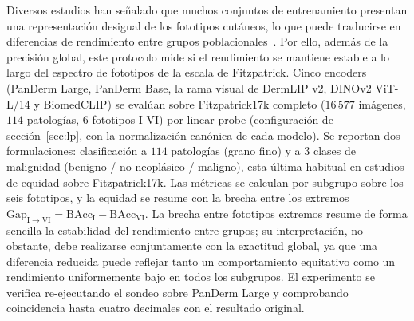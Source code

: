 Diversos estudios han señalado que muchos conjuntos de entrenamiento
presentan una representación desigual de los fototipos cutáneos, lo
que puede traducirse en diferencias de rendimiento entre grupos
poblacionales~\cite{ddi}. Por ello, además de la precisión global,
este protocolo mide si el rendimiento se mantiene estable a lo largo
del espectro de fototipos de la escala de Fitzpatrick. Cinco
encoders (PanDerm Large, PanDerm Base, la rama
visual de DermLIP v2, DINOv2 ViT-L/14 y BiomedCLIP) se evalúan sobre
Fitzpatrick17k completo ($16\,577$ imágenes, $114$ patologías,
$6$ fototipos I-VI) por linear probe (configuración de
sección~\ref{sec:lp}, con la normalización canónica de cada
modelo). Se reportan dos formulaciones: clasificación a $114$
patologías (grano fino) y a $3$ clases de malignidad
(benigno / no neoplásico / maligno), esta última habitual en
estudios de equidad sobre Fitzpatrick17k. Las métricas se calculan
por subgrupo sobre los seis fototipos, y la equidad se resume con la
brecha entre los extremos
$\mathrm{Gap}_{\mathrm{I}\to\mathrm{VI}} =
\mathrm{BAcc}_{\mathrm{I}} - \mathrm{BAcc}_{\mathrm{VI}}$. La
brecha entre fototipos extremos resume de forma sencilla la
estabilidad del rendimiento entre grupos; su interpretación, no
obstante, debe realizarse conjuntamente con la exactitud global, ya
que una diferencia reducida puede reflejar tanto un comportamiento
equitativo como un rendimiento uniformemente bajo en todos los
subgrupos. El experimento se verifica re-ejecutando el sondeo sobre
PanDerm Large y comprobando coincidencia hasta cuatro decimales con
el resultado original.

